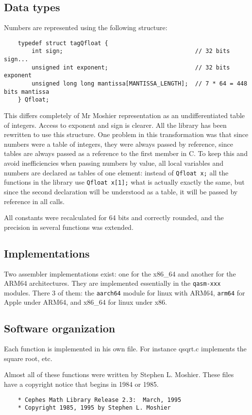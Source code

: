\documentclass[10pt,a4paper,x11names]{memoir} %
\begin{document}
\subsection{Data types}
Numbers are represented using the following structure:
\begin{lstlisting}
	typedef struct tagQfloat {
		int sign;                                      // 32 bits sign...
		unsigned int exponent;                         // 32 bits exponent
		unsigned long long mantissa[MANTISSA_LENGTH];  // 7 * 64 = 448 bits mantissa
	} Qfloat;
\end{lstlisting}

This differs completely of Mr Moshier representation as an undifferentiated table of integers. Access to exponent
and sign is clearer. All the library has been rewritten to use this structure. One problem in this transformation was that since numbers were a table of integers, they were always passed by reference, since tables are always passed as a reference to the first member in C. To keep this and avoid inefficiencies when passing numbers by value, all local variables and numbers are declared as tables of one element: instead of \verb,Qfloat x;, all the functions in the library use \verb,Qfloat x[1];, what is actually exactly the same, but since the second declaration will be understood as a table, it will be passed by reference in all calls.

All constants were recalculated for 64 bits and correctly rounded, and the precision in several functions was extended.
\subsection{Implementations}
Two assembler implementations exist: one for the x86\_64 and another for the ARM64 architectures. They are implemented essentially in the \verb,qasm-xxx, modules. There 3 of them: the \verb,aarch64, module for linux with ARM64, \verb,arm64, for Apple under ARM64, and x86\_64 for linux  under x86.
\subsection{Software organization}
Each function is implemented in  his own file. For instance qsqrt.c implements the square root, etc. 

Almost all of these functions were written by Stephen L. Moshier. These files have a copyright notice that begins in 1984 or 1985.
\begin{verbatim}
	* Cephes Math Library Release 2.3:  March, 1995
	* Copyright 1985, 1995 by Stephen L. Moshier
	
\end{verbatim}
\end{document}

